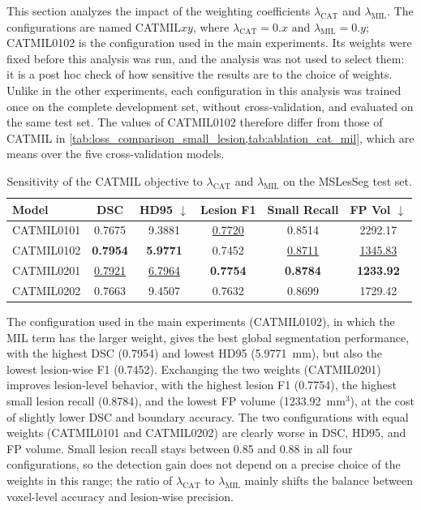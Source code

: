 This section analyzes the impact of the weighting coefficients
$\lambda_{\text{CAT}}$ and $\lambda_{\text{MIL}}$. The configurations are
named CATMIL$xy$, where $\lambda_{\text{CAT}}=0.x$ and
$\lambda_{\text{MIL}}=0.y$; CATMIL0102 is the configuration used in the
main experiments. Its weights were fixed before this analysis was run, and
the analysis was not used to select them: it is a post hoc check of how
sensitive the results are to the choice of weights. Unlike in the other
experiments, each configuration in this analysis was trained once on the
complete development set, without cross-validation, and evaluated on the
same test set. The values of CATMIL0102 therefore differ from those of
CATMIL in \cref{tab:loss_comparison_small_lesion,tab:ablation_cat_mil},
which are means over the five cross-validation models.

\begin{table}[H]
\centering
\caption{Sensitivity of the CATMIL objective to $\lambda_{\text{CAT}}$ and
$\lambda_{\text{MIL}}$ on the MSLesSeg test set.}
\label{tab:ablation_lambda}
\begin{tabular}{lccccc}
\toprule
Model & DSC & HD95 $\downarrow$ & Lesion F1 & Small Recall & FP Vol $\downarrow$ \\
\midrule
CATMIL0101 & 0.7675 & 9.3881 & \underline{0.7720} & 0.8514 & 2292.17 \\
CATMIL0102 & \textbf{0.7954} & \textbf{5.9771} & 0.7452 & \underline{0.8711} & \underline{1345.83} \\
CATMIL0201 & \underline{0.7921} & \underline{6.7964} & \textbf{0.7754} & \textbf{0.8784} & \textbf{1233.92} \\
CATMIL0202 & 0.7663 & 9.4507 & 0.7632 & 0.8699 & 1729.42 \\
\bottomrule
\end{tabular}
\end{table}

The configuration used in the main experiments (CATMIL0102), in which the
MIL term has the larger weight, gives the best global segmentation
performance, with the highest DSC (0.7954) and lowest HD95 (5.9771~mm), but
also the lowest lesion-wise F1 (0.7452). Exchanging the two weights
(CATMIL0201) improves lesion-level behavior, with the highest lesion F1
(0.7754), the highest small lesion recall (0.8784), and the lowest FP
volume (1233.92~mm$^3$), at the cost of slightly lower DSC and boundary
accuracy. The two configurations with equal weights (CATMIL0101 and
CATMIL0202) are clearly worse in DSC, HD95, and FP volume. Small lesion
recall stays between 0.85 and 0.88 in all four configurations, so the
detection gain does not depend on a precise choice of the weights in this
range; the ratio of $\lambda_{\text{CAT}}$ to $\lambda_{\text{MIL}}$ mainly
shifts the balance between voxel-level accuracy and lesion-wise precision.

